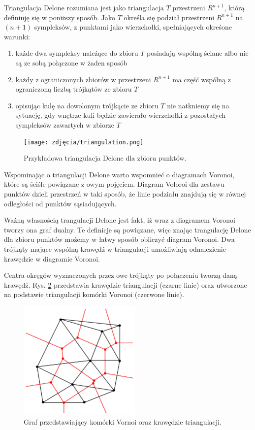 Triangulacja Delone \cite{tDelone} rozumiana jest jako triangulacja $T$ przestrzeni $R^{n+1}$, którą definiuję się w poniższy sposób. Jako $T$ określa się podział przestrzeni $R^{n+1}$ na $(n+1)$ sympleksów, z punktami jako wierzchołki, spełniających okreśone warunki:

\begin{enumerate}
    \item każde dwa sympleksy należące do zbioru $T$ posiadają wspólną ściane albo nie są ze sobą połączone w żaden sposób
    \item każdy z ograniczonych zbiorów w przestrzeni $R^{n+1}$ ma część wspólną z ograniczoną liczbą trójkątów ze zbioru $T$
    \item opisując kulę na dowolonym trójkącie ze zbioru $T$ nie natkniemy się na sytuację, gdy wnętrze kuli będzie zawierało wierzchołki z pozostałych sympleksów zawartych w zbiorze $T$
\end{enumerate}

\begin{figure}[h]
	\centering
	\texttt{[image: zdjęcia/triangulation.png]}
	\caption{Przykładowa triangulacja Delone dla zbioru punktów. \cite{tDelone}}
	\label{fig:delone}
\end{figure}

Wspominając o triangulacji Delone warto wspomnieć o diagramach Voronoi, które są ściśle powiązane z owym pojęciem. Diagram Voloroi dla zestawu punktów dzieli przestrzeń w taki sposób, że linie podziału znajdują się w równej odległości od punktów sąsiadujących.

Ważną własnością trangulacji Delone jest fakt, iż wraz z diagramem Voronoi tworzy ona graf dualny. Te definicje są powiązane, więc znając trangulację Delone dla zbioru punktów możemy w łatwy sposób obliczyć diagram Voronoi. Dwa trójkąty mające wspólną krawędź w triangulacji umożliwiają odnalezienie krawędzie w diagramie Voronoi. 

Centra okręgów wyznaczonych przez owe trójkąty po połączeniu tworzą daną krawędź. Rys. \ref{fig:voronoi}  przedstawia krawędzie triangulacji (czarne linie) oraz utworzone na podstawie triangulacji komórki Voronoi (czerwone linie).

\begin{figure}[h]
	\centering
	\includegraphics[width=6cm]{zdjęcia/voronoi.png}
	\caption{Graf przedstawiający komórki Vornoi oraz krawędzie triangulacji. \cite{tDelone}} 
	\label{fig:voronoi}
\end{figure}

